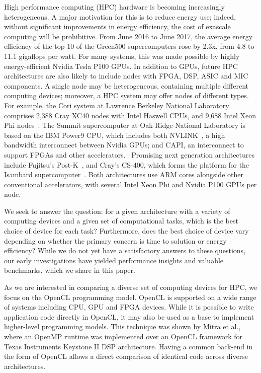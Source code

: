 \documentclass[../document.tex]{subfiles}
\begin{document}
\label{sec:introduction}
	
High performance computing (HPC) hardware is becoming increasingly heterogeneous.
A major motivation for this is to reduce energy use; indeed, without significant improvements in energy efficiency, the cost of exascale computing will be prohibitive.
From June 2016 to June 2017, the average energy efficiency of the top 10 of the Green500 supercomputers rose by 2.3x, from 4.8 to 11.1 gigaflops per watt.\cite{feldman_2017}
For many systems, this was made possible by highly energy-efficient Nvidia Tesla P100 GPUs.
In addition to GPUs, future HPC architectures are also likely to include nodes with FPGA, DSP, ASIC and MIC components.
A single node may be heterogeneous, containing multiple different computing devices; moreover, a HPC system may offer nodes of different types.
For example, the Cori system at Lawrence Berkeley National Laboratory comprises 2,388 Cray XC40 nodes with Intel Haswell CPUs, and 9,688 Intel Xeon Phi nodes~\cite{declerck2016cori}.
The Summit supercomputer at Oak Ridge National Laboratory is based on the IBM Power9 CPU, which includes both NVLINK~\cite{morgan_2016}, a high bandwidth interconnect between Nvidia GPUs; and CAPI, an interconnect to support FPGAs and other accelerators.~\cite{morgan_2017}
Promising next generation architectures include Fujitsu's Post-K~\cite{morgan_2016_postk}, and Cray's CS-400, which forms the platform for the Isambard supercomputer~\cite{feldman_2017_isambard}.
Both architectures use ARM cores alongside other conventional accelerators, with several Intel Xeon Phi and Nvidia P100 GPUs per node.

We seek to answer the question: for a given architecture with a variety of computing devices and a given set of computational tasks, which is the best choice of device for each task?
Furthermore, does the best choice of device vary depending on whether the primary concern is time to solution or energy efficiency?
While we do not yet have a satisfactory answers to these questions, our early investigations have yielded performance insights and valuable benchmarks, which we share in this paper.

As we are interested in comparing a diverse set of computing devices for HPC, we focus on the OpenCL programming model.
OpenCL is supported on a wide range of systems including CPU, GPU and FPGA devices.
While it is possible to write application code directly in OpenCL, it may also be used as a base to implement higher-level programming models.
This technique was shown by Mitra et al.,~\cite{mitra2014implementation} where an OpenMP runtime was implemented over an OpenCL framework for Texas Instruments Keystone II DSP architecture.
Having a common back-end in the form of OpenCL allows a direct comparison of identical code across diverse architectures.
\end{document}
